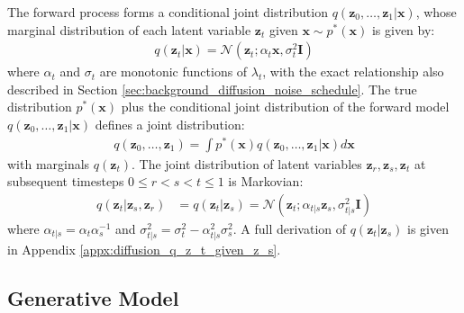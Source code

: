 \documentclass[ oneside,%
                    author={George Herbert},
                    degree={MSci},
                     title={Video Diffusion Models for Climate Simulations},
                  subtitle={}]{dissertation}
\begin{document}
The forward process forms a conditional joint distribution $q(\mathbf{z}_0,\ldots,\mathbf{z}_1|\mathbf{x})$, whose marginal distribution of each latent variable $\mathbf{z}_t$ given $\mathbf{x}\sim p^*(\mathbf{x})$ is given by:
\begin{align}
      q(\mathbf{z}_t|\mathbf{x})=\mathcal{N}\left(\mathbf{z}_t;\alpha_t\mathbf{x},\sigma_t^2\mathbf{I}\right)
      \label{eq:q_z_t_given_x}
\end{align}
where $\alpha_t$ and $\sigma_t$ are monotonic functions of $\lambda_t$, with the exact relationship also described in Section \ref{sec:background_diffusion_noise_schedule}. The true distribution $p^*(\mathbf{x})$ plus the conditional joint distribution of the forward model $q(\mathbf{z}_0,\ldots,\mathbf{z}_1|\mathbf{x})$ defines a joint distribution:
\begin{align}
      q(\mathbf{z}_0,\ldots,\mathbf{z}_1)=\int p^*(\mathbf{x}) q(\mathbf{z}_0,\ldots,\mathbf{z}_1|\mathbf{x}) d\mathbf{x}
\end{align}
with marginals $q(\mathbf{z}_t)$. The joint distribution of latent variables $\mathbf{z}_r,\mathbf{z}_s,\mathbf{z}_t$ at subsequent timesteps $0\le r < s < t \le 1$ is Markovian:
\begin{align}
      q(\mathbf{z}_t|\mathbf{z}_s,\mathbf{z}_r)&=q(\mathbf{z}_t|\mathbf{z}_s)=\mathcal{N}\left(\mathbf{z}_t; \alpha_{t|s}\mathbf{z}_s, \sigma_{t|s}^2\mathbf{I}\right)
\end{align}
where $\alpha_{t|s}=\alpha_t\alpha_s^{-1}$ and $\sigma_{t|s}^2=\sigma_t^2-\alpha_{t|s}^2\sigma_s^2$. A full derivation of $q(\mathbf{z}_t|\mathbf{z}_s)$ is given in Appendix \ref{appx:diffusion_q_z_t_given_z_s}.

\subsection{Generative Model}
\label{sec:background_diffusion_reverse}
\end{document}
